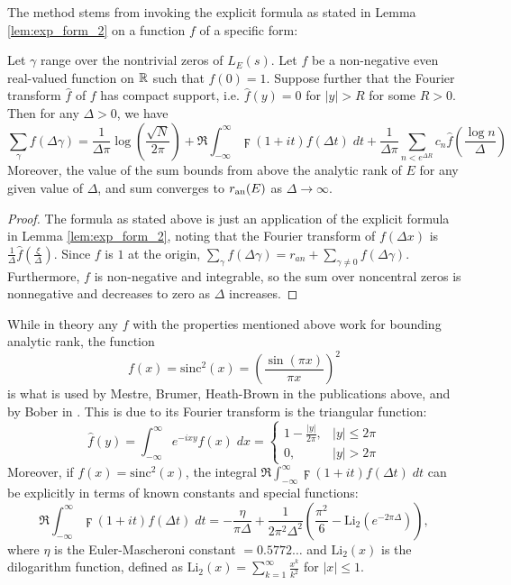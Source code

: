 \documentclass[10pt]{article}
\newcommand{\sinc}{\text{sinc}}
\newcommand{\Li}{\text{Li}}
\begin{document}
The method stems from invoking the explicit formula as stated in Lemma \ref{lem:exp_form_2} on a function $f$ of a specific form:
\begin{lemma}\label{lem:exp_form_nonneg_f_cpt_suppt}
Let $\gamma$ range over the nontrivial zeros of $L_E(s)$. Let $f$ be a non-negative even real-valued function on $\mathbb{R}$ such that $f(0)=1$. Suppose further that the Fourier transform $\hat{f}$ of $f$ has compact support, i.e. $\hat{f}(y) = 0$ for $|y|>R$ for some $R>0$. Then for any $\Delta>0$, we have
\begin{equation}
\sum_{\gamma} f(\Delta \gamma) = \frac{1}{\Delta \pi}\log\left(\frac{\sqrt{N}}{2\pi}\right) + \Re\int_{-\infty}^{\infty} \digamma(1+it)f(\Delta t) \; dt  + \frac{1}{\Delta \pi}\sum_{n<e^{\Delta R}} c_n \hat{f}\left(\frac{\log n}{\Delta}\right)
\end{equation}
Moreover, the value of the sum bounds from above the analytic rank of $E$ for any given value of $\Delta$, and sum converges to $r_{{\rm an}}(E)$ as $\Delta \to \infty$.
\end{lemma}

\begin{proof}
The formula as stated above is just an application of the explicit formula in Lemma \ref{lem:exp_form_2}, noting that the Fourier transform of $f(\Delta x)$ is $\frac{1}{\Delta}\hat{f}\left(\frac{\xi}{\Delta}\right)$. Since $f$ is $1$ at the origin, $\sum_{\gamma} f(\Delta \gamma) = r_{an} + \sum_{\gamma\ne 0} f(\Delta \gamma)$. Furthermore, $f$ is non-negative and integrable, so the sum over noncentral zeros is nonnegative and decreases to zero as $\Delta$ increases.
\end{proof}

While in theory any $f$ with the properties mentioned above work for bounding analytic rank, the function
\begin{equation}
f(x) = \sinc^2(x) = \left(\frac{\sin(\pi x)}{\pi x}\right)^2
\end{equation}
is what is used by Mestre, Brumer, Heath-Brown in the publications above, and by Bober in \cite{Bob-2011}. This is due to its Fourier transform is the triangular function:
\begin{equation}
\hat{f}(y) = \int_{-\infty}^{\infty} e^{-i x y}f(x)\; dx =  \begin{cases} 1 - \frac{|y|}{2\pi}, & |y|\le 2\pi \\ 0, & |y| > 2\pi\end{cases}
\end{equation}
Moreover, if $f(x) = \sinc^2(x)$, the integral $\Re\int_{-\infty}^{\infty} \digamma(1+it)f(\Delta t) \; dt$ can be explicitly in terms of known constants and special functions:
\begin{equation}
\Re\int_{-\infty}^{\infty} \digamma(1+it)f(\Delta t) \; dt = - \frac{\eta}{\pi \Delta} + \frac{1}{2\pi^2 \Delta^2}\left(\frac{\pi^2}{6} - \Li_2\left(e^{-2\pi \Delta}\right)\right),
\end{equation}
where $\eta$ is the Euler-Mascheroni constant $= 0.5772\ldots$ and $\Li_2(x)$ is the dilogarithm function, defined as $\Li_2(x) = \sum_{k=1}^{\infty} \frac{x^k}{k^2}$ for $|x|\le 1$.
\end{document}
